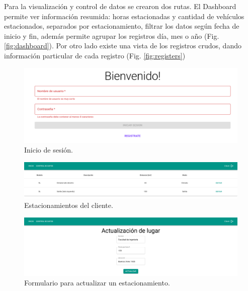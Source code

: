 Para la visualización y control de datos se crearon dos rutas.
El Dashboard permite ver información resumida: horas estacionadas y cantidad de vehículos estacionados, separados por estacionamiento, filtrar los datos según fecha de inicio y fin, además permite agrupar los registros día, mes o año (Fig. \ref{fig:dashboard}).
Por otro lado existe una vista de los registros crudos, dando información particular de cada registro (Fig. \ref{fig:registers})


\begin{figure}[!bth]
    \centering
    \includegraphics[width=.8\textwidth]{imgs/server/login.png}
    \caption{Inicio de sesión.}
    \label{fig:login}
\end{figure}

\begin{figure}[!bth]
    \centering
    \includegraphics[width=.8\textwidth]{imgs/server/places.png}
    \caption{Estacionamientos del cliente.}
    \label{fig:home}
\end{figure}

\begin{figure}[!bth]
    \centering
    \includegraphics[width=.8\textwidth]{imgs/server/update-place.png}
    \caption{Formulario para actualizar un estacionamiento.}
    \label{fig:update-place}
\end{figure}


